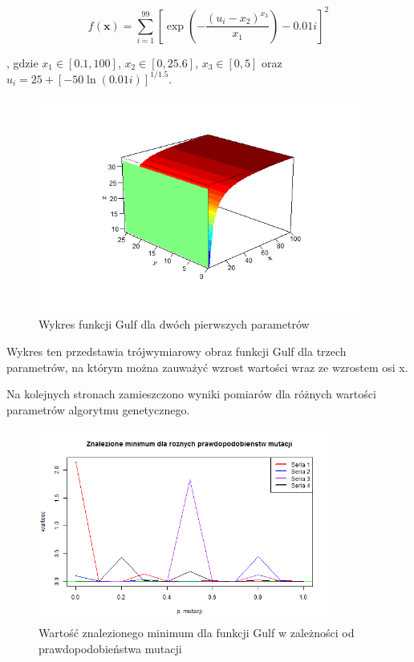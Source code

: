 \documentclass[11pt, a4paper]{article}
\newcommand{\fbi}{\leavevmode{\parindent=1em\indent}}
\begin{document}
\begin{equation}\label{eq:gulf}
f(\boldsymbol{x}) = \sum_{i=1}^{99} [\exp(- \frac{(u_i - x_2)^{x_3}}{x_1}) - 0.01i]^2
\end{equation}

, gdzie $ x_1 \in [0.1, 100] $, $ x_2 \in [0, 25.6] $, $ x_3 \in [0, 5] $ oraz $ u_i = 25 + [-50 \ln (0.01i)]^{1/1.5} $.

\begin{figure}[H]
	\begin{center}
		\includegraphics[width=0.95\textwidth]{./assets/Gulf1.png}
		\caption{Wykres funkcji Gulf dla dwóch pierwszych parametrów}
		\label{fig:gulf1}
	\end{center}
\end{figure}

\fbi
Wykres ten przedstawia trójwymiarowy obraz funkcji Gulf dla trzech parametrów, na którym można zauważyć wzrost wartości wraz ze wzrostem osi x.

\fbi
Na kolejnych stronach zamieszczono wyniki pomiarów dla różnych wartości parametrów algorytmu genetycznego.

\begin{figure}[H]
	\begin{center}
		\includegraphics[width=0.85\textwidth]{./assets/Gulf2.png}
		\caption{Wartość znalezionego minimum dla funkcji Gulf w zależności od prawdopodobieństwa mutacji}
		\label{fig:gulf2}
	\end{center}
\end{figure}
\end{document}
